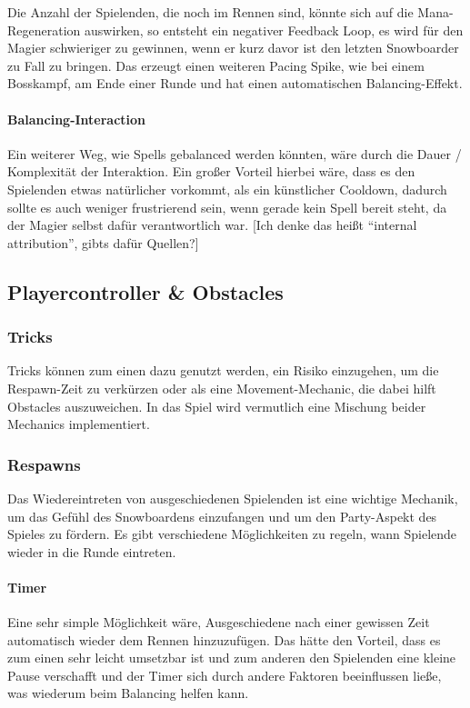 Die Anzahl der Spielenden, die noch im Rennen sind, könnte sich auf die Mana-Regeneration auswirken, so entsteht ein negativer Feedback Loop, es wird für den Magier schwieriger zu gewinnen, wenn er kurz davor ist den letzten Snowboarder zu Fall zu bringen. Das erzeugt einen weiteren Pacing Spike, wie bei einem Bosskampf, am Ende einer Runde und hat einen automatischen Balancing\cite[S. 296]{_game_design_workshop}-Effekt.

\paragraph{Balancing-Interaction}
Ein weiterer Weg, wie Spells gebalanced werden könnten, wäre durch die Dauer / Komplexität der Interaktion. Ein großer Vorteil hierbei wäre, dass es den Spielenden etwas natürlicher vorkommt, als ein künstlicher Cooldown, dadurch sollte es auch weniger frustrierend sein, wenn gerade kein Spell bereit steht, da der Magier selbst dafür verantwortlich war. [Ich denke das heißt "`internal attribution"', gibts dafür Quellen?]

\subsection{Playercontroller \& Obstacles\label{_playercontroller}}
\subsubsection{Tricks}
Tricks können zum einen dazu genutzt werden, ein Risiko einzugehen, um die Respawn-Zeit zu verkürzen oder als eine Movement-Mechanic, die dabei hilft Obstacles auszuweichen. In das Spiel wird vermutlich eine Mischung beider Mechanics implementiert.

\subsubsection{Respawns}
Das Wiedereintreten von ausgeschiedenen Spielenden ist eine wichtige Mechanik, um das Gefühl des Snowboardens einzufangen und um den Party-Aspekt des Spieles zu fördern. Es gibt verschiedene Möglichkeiten zu regeln, wann Spielende wieder in die Runde eintreten.

\paragraph{Timer}
Eine sehr simple Möglichkeit wäre, Ausgeschiedene nach einer gewissen Zeit automatisch wieder dem Rennen hinzuzufügen. Das hätte den Vorteil, dass es zum einen sehr leicht umsetzbar ist und zum anderen den Spielenden eine kleine Pause verschafft und der Timer sich durch andere Faktoren beeinflussen ließe, was wiederum beim Balancing helfen kann.

